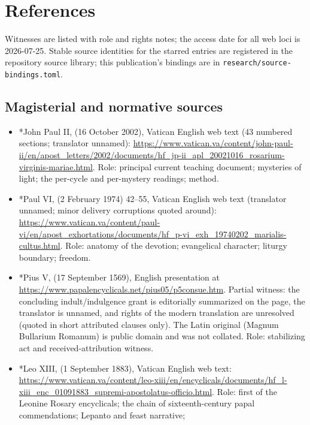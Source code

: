 \sectionguard
\section{References}

Witnesses are listed with role and rights notes; the access date for
all web loci is 2026-07-25. Stable source identities for the starred
entries are registered in the repository source library; this
publication's bindings are in \texttt{research/source-bindings.toml}.

\subsection*{Magisterial and normative sources}

\begin{itemize}
\item *John Paul II,  (16 October
2002), Vatican English web text (43 numbered sections; translator
unnamed):
\url{https://www.vatican.va/content/john-paul-ii/en/apost_letters/2002/documents/hf_jp-ii_apl_20021016_rosarium-virginis-mariae.html}.
Role: principal current teaching document; mysteries of light; the
per-cycle and per-mystery readings; method.
\item *Paul VI,  (2 February 1974) 42--55,
Vatican English web text (translator unnamed; minor delivery
corruptions quoted around):
\url{https://www.vatican.va/content/paul-vi/en/apost_exhortations/documents/hf_p-vi_exh_19740202_marialis-cultus.html}.
Role: anatomy of the devotion; evangelical character; liturgy boundary;
freedom.
\item *Pius V,  (17 September
1569), English presentation at
\url{https://www.papalencyclicals.net/pius05/p5consue.htm}. Partial
witness: the concluding indult/indulgence grant is editorially
summarized on the page, the translator is unnamed, and rights of the
modern translation are unresolved (quoted in short attributed clauses
only). The Latin original (Magnum Bullarium Romanum) is public domain
and was not collated. Role: stabilizing act and received-attribution
witness.
\item *Leo XIII,  (1 September
1883), Vatican English web text:
\url{https://www.vatican.va/content/leo-xiii/en/encyclicals/documents/hf_l-xiii_enc_01091883_supremi-apostolatus-officio.html}.
Role: first of the Leonine Rosary encyclicals; the chain of
sixteenth-century papal commendations; Lepanto and feast narrative;

\end{itemize}
